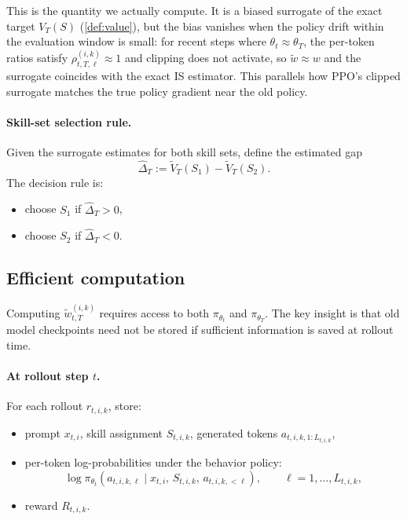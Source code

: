 This is the quantity we actually compute.  It is a biased surrogate of the exact target $V_T(S)$ (\cref{def:value}), but the bias vanishes when the policy drift within the evaluation window is small: for recent steps where $\theta_t \approx \theta_T$, the per-token ratios satisfy $\rho_{t,T,\ell}^{(i,k)} \approx 1$ and clipping does not activate, so $\tilde{w} \approx w$ and the surrogate coincides with the exact IS estimator.  This parallels how PPO's clipped surrogate matches the true policy gradient near the old policy.

\paragraph{Skill-set selection rule.}
Given the surrogate estimates for both skill sets, define the estimated gap
\begin{equation}
\label{eq:iw_gap}
    \hat{\Delta}_T := \tilde{V}_T(S_1) - \tilde{V}_T(S_2).
\end{equation}
The decision rule is:
\begin{itemize}
    \item choose $S_1$ if $\hat{\Delta}_T > 0$,
    \item choose $S_2$ if $\hat{\Delta}_T < 0$.
\end{itemize}

\subsection{Efficient computation}
\label{app:iw:efficient}

Computing $\tilde{w}_{t,T}^{(i,k)}$ requires access to both $\pi_{\theta_t}$ and $\pi_{\theta_T}$.  The key insight is that old model checkpoints need not be stored if sufficient information is saved at rollout time.

\paragraph{At rollout step $t$.} For each rollout $r_{t,i,k}$, store:
\begin{itemize}
    \item prompt $x_{t,i}$, skill assignment $S_{t,i,k}$, generated tokens $a_{t,i,k,1:L_{t,i,k}}$,
    \item per-token log-probabilities under the behavior policy:
    \begin{equation}
        \log \pi_{\theta_t}(a_{t,i,k,\ell} \mid x_{t,i},\, S_{t,i,k},\, a_{t,i,k,<\ell}), \qquad \ell = 1, \ldots, L_{t,i,k},
    \end{equation}
    \item reward $R_{t,i,k}$.
\end{itemize}

